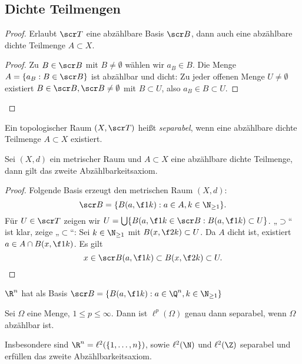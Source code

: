 \subsection{Dichte Teilmengen}

\begin{proof}
	Erlaubt $\scr T$ eine abzählbare Basis $\scr B$, dann auch eine abzählbare dichte Teilmenge $A \subset X$.
	\begin{proof}
		Zu $B \in \scr B$ mit $B \neq \emptyset$ wählen wir $a_B \in B$.
		Die Menge $A = \{a_B : B \in \scr B\}$ ist abzählbar und dicht:
		Zu jeder offenen Menge $U \neq \emptyset$ existiert $B \in \scr B, \scr B \neq \emptyset$ mit $B \subset U$, also $a_B \in B \subset U$.
	\end{proof}
\end{proof}

\begin{df}
	Ein topologischer Raum $(X, \scr T)$ heißt \emph{separabel}, wenn eine abzählbare dichte Teilmenge $A \subset X$ existiert.
\end{df}

\begin{st}
	Sei $(X,d)$ ein metrischer Raum und $A \subset X$ eine abzählbare dichte Teilmenge, dann gilt das zweite Abzählbarkeitsaxiom.
	\begin{proof}
		Folgende Basis erzeugt den metrischen Raum $(X,d)$:
		\[
			\scr B = \{ B(a, \f 1k) : a \in A, k \in \N_{\ge 1} \}.
		\]
		Für $U \in \scr T$ zeigen wir $U = \bigcup \{ B(a, \f 1k \in \scr B : B(a, \f 1k) \subset U \}$.
		„$\supset$“ ist klar, zeige „$\subset$“:
		Sei $k \in \N_{\ge 1}$ mit $B(x, \f 2k) \subset U$.
		Da $A$ dicht ist, existiert $a \in A \cap B(x, \f 1k)$.
		Es gilt
		\[
			x \in \scr B(a, \f 1k) \subset B(x, \f 2k) \subset U.
		\]
	\end{proof}
\end{st}

\begin{ex}
	$\R^n$ hat als Basis $\scr B = \{ B(a, \f 1k) : a \in \Q^n, k \in \N_{\ge 1} \}$
\end{ex}

\begin{st}
	Sei $\Omega$ eine Menge, $1 \le p \le \infty$.
	Dann ist $\ell^p(\Omega)$ genau dann separabel, wenn $\Omega$ abzählbar ist.

	Insbesondere sind $\R^n = \ell^2(\{1, \dotsc, n\})$, sowie $\ell^2(\N)$ und $\ell^2(\Z)$ separabel und erfüllen das zweite Abzählbarkeitsaxiom.
\end{st}


